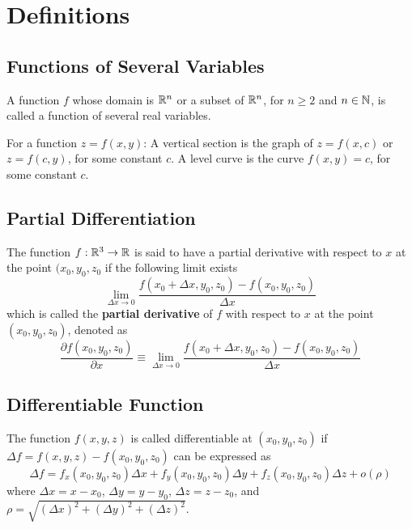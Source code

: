 \chapter{Definitions}
\theoremstyle{definition}

\section{Functions of Several Variables}
\begin{mydef}
\normalfont A function \(f\) whose domain is \(\mathbb{R}^n\) or a subset of \(\mathbb{R}^n\), for \(n \ge 2\) and \(n \in \mathbb{N}\), is called a function of several real variables.
\end{mydef}


\begin{mydef}
\normalfont For a function \(z = f(x, y)\): A vertical section is the graph of \(z = f(x, c)\) or \(z = f(c, y)\), for some constant \(c\). A level curve is the curve \(f(x, y) = c\), for some constant \(c\).
\end{mydef}


\section{Partial Differentiation}
\begin{mydef}
\normalfont The function \(f : \mathbb{R}^3 \to \mathbb{R}\) is said to have a partial derivative with respect to \(x\) at the point \((x_0, y_0, z_0\) if the following limit exists
%
\[\lim_{\Delta x \to 0}{\frac{f(x_0 + \Delta x, y_0, z_0) - f(x_0, y_0, z_0)}{\Delta x}}\]
%
which is called the \textbf{partial derivative} of \(f\) with respect to \(x\) at the point \((x_0, y_0, z_0)\), denoted as
%
\[\frac{\partial f(x_0, y_0, z_0)}{\partial x} \equiv \lim_{\Delta x \to 0}{\frac{f(x_0 + \Delta x, y_0, z_0) - f(x_0, y_0, z_0)}{\Delta x}}\]
\end{mydef}

\section{Differentiable Function}
\begin{mydef}
\normalfont The function \(f(x, y, z)\) is called differentiable at \((x_0, y_0, z_0)\) if \(\Delta f = f(x, y, z) - f(x_0, y_0, z_0)\) can be expressed as
%
\[\Delta f = f_x(x_0,y_0,z_0)\Delta x + f_y(x_0,y_0,z_0)\Delta y + f_z(x_0,y_0,z_0)\Delta z + o(\rho)\]
%
where \(\Delta x = x - x_0\), \(\Delta y = y - y_0\), \(\Delta z = z - z_0\), and \(\rho = \sqrt{(\Delta x)^2 + (\Delta y)^2 + (\Delta z)^2}\).
\end{mydef}

